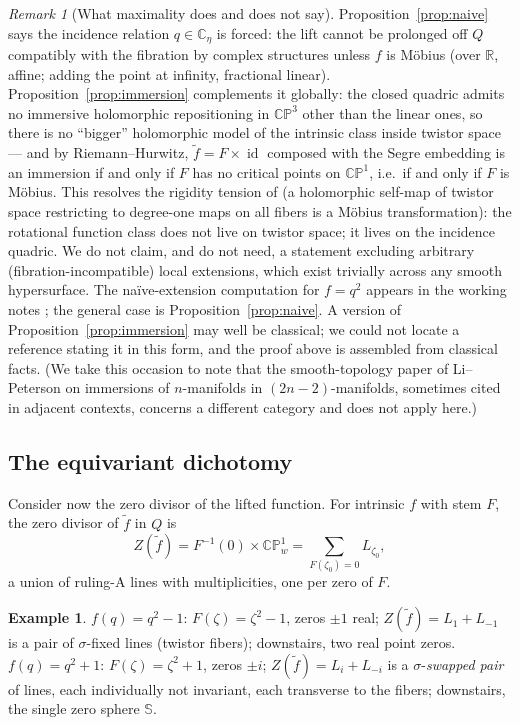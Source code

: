\documentclass[11pt]{amsart}
\theoremstyle{plain}
\theoremstyle{definition}
\newtheorem{example}[theorem]{Example}
\theoremstyle{remark}
\newtheorem{remark}[theorem]{Remark}
\newcommand{\CC}{\mathbb{C}}
\newcommand{\RR}{\mathbb{R}}
\newcommand{\CP}{\mathbb{CP}}
\renewcommand{\SS}{\mathbb{S}}
\newcommand{\id}{\operatorname{id}}
\begin{document}
\begin{remark}[What maximality does and does not say]\label{rem:maximality}
Proposition~\ref{prop:naive} says the incidence relation $q\in\CC_\eta$ is forced: the lift cannot
be prolonged off $Q$ compatibly with the fibration by complex structures unless $f$ is M\"obius
(over $\RR$, affine; adding the point at infinity, fractional linear). Proposition~\ref{prop:immersion}
complements it globally: the closed quadric admits no immersive holomorphic repositioning in
$\CP^3$ other than the linear ones, so there is no ``bigger'' holomorphic model of the intrinsic
class inside twistor space --- and by Riemann--Hurwitz, $\tilde f=F\times\id$ composed with the
Segre embedding is an immersion if and only if $F$ has no critical points on $\CP^1$, i.e.\ if and
only if $F$ is M\"obius. This resolves the rigidity tension of \cite[Prop.~3.1]{Baker2017} (a
holomorphic self-map of twistor space restricting to degree-one maps on all fibers is a M\"obius
transformation): the rotational function class does not live on twistor space; it lives on the
incidence quadric. We do not claim, and do not need, a statement excluding arbitrary
(fibration-incompatible) local extensions, which exist trivially across any smooth hypersurface.
The na\"ive-extension computation for $f=q^2$ appears in the working notes \cite{ZenodoArchive};
the general case is Proposition~\ref{prop:naive}. A version of Proposition~\ref{prop:immersion}
may well be classical; we could not locate a reference stating it in this form, and the proof
above is assembled from classical facts. (We take this occasion to note that the smooth-topology
paper of Li--Peterson on immersions of $n$-manifolds in $(2n{-}2)$-manifolds, sometimes cited in
adjacent contexts, concerns a different category and does not apply here.)
\end{remark}

\subsection{The equivariant dichotomy}

Consider now the zero divisor of the lifted function. For intrinsic $f$ with stem $F$, the zero
divisor of $\tilde f$ in $Q$ is
\[
Z(\tilde f)=F^{-1}(0)\times\CP^1_w=\sum_{F(\zeta_0)=0}L_{\zeta_0},
\]
a union of ruling-A lines with multiplicities, one per zero of $F$.

\begin{example}\label{ex:modelcases}
$f(q)=q^2-1$: $F(\zeta)=\zeta^2-1$, zeros $\pm1$ real; $Z(\tilde f)=L_1+L_{-1}$ is a pair of
$\sigma$-fixed lines (twistor fibers); downstairs, two real point zeros.
$f(q)=q^2+1$: $F(\zeta)=\zeta^2+1$, zeros $\pm i$; $Z(\tilde f)=L_i+L_{-i}$ is a
$\sigma$-\emph{swapped pair} of lines, each individually not invariant, each transverse to the
fibers; downstairs, the single zero sphere $\SS$.
\end{example}
\end{document}
